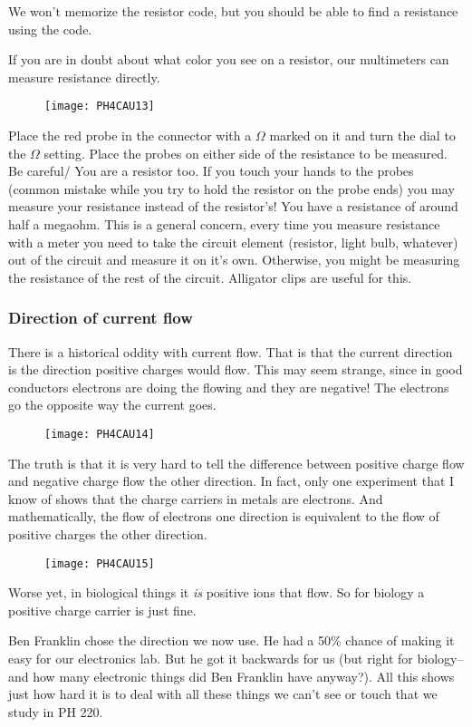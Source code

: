 We won't memorize the resistor code, but you should be able to find a
resistance using the code.

If you are in doubt about what color you see on a resistor, our multimeters
can measure resistance directly. \begin{figure}[h!]
\texttt{[image: PH4CAU13]}
\end{figure}Place the red probe in the
connector with a $\Omega $ marked on it and turn the dial to the $\Omega $
setting. Place the probes on either side of the resistance to be measured.
Be careful/ You are a resistor too. If you touch your hands to the probes
(common mistake while you try to hold the resistor on the probe ends) you
may measure your resistance instead of the resistor's! You have a resistance
of around half a megaohm. This is a general concern, every time you measure
resistance with a meter you need to take the circuit element (resistor,
light bulb, whatever) out of the circuit and measure it on it's own.
Otherwise, you might be measuring the resistance of the rest of the circuit.
Alligator clips are useful for this.

\subsubsection{Direction of current flow}

There is a historical oddity with current flow. That is that the current
direction is the direction positive charges would flow. This may seem
strange, since in good conductors electrons are doing the flowing and they
are negative! The electrons go the opposite way the current goes. \begin{figure}[h!]
\texttt{[image: PH4CAU14]}
\end{figure}%
The truth is that it is very hard to tell the difference between positive
charge flow and negative charge flow the other direction. In fact, only one
experiment that I know of shows that the charge carriers in metals are
electrons. And mathematically, the flow of electrons one direction is
equivalent to the flow of positive charges the other direction.\begin{figure}[h!]
\texttt{[image: PH4CAU15]}
\end{figure}%
Worse yet, in biological things it \emph{is} positive ions that flow. So for
biology a positive charge carrier is just fine.

Ben Franklin chose the direction we now use. He had a 50\% chance of making
it easy for our electronics lab. But he got it backwards for us (but right
for biology--and how many electronic things did Ben Franklin have anyway?).
All this shows just how hard it is to deal with all these things we can't
see or touch that we study in PH 220.

